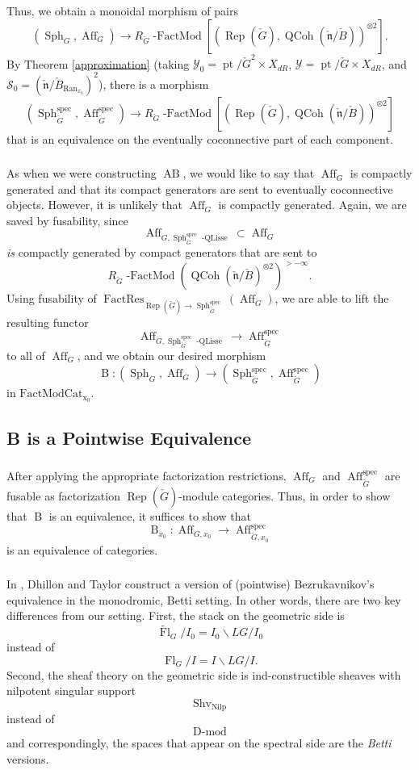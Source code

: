 \documentclass[10pt,a4paper]{amsart}
\newcommand{\on}[1]{\operatorname{#1}}
\newcommand{\Dmod}{\on{D-mod}}
\newcommand{\Gcheck}{\check{G}}
\newcommand{\ncheck}{\check{\mathfrak{n}}}
\newcommand{\Bcheck}{\check{B}}
\newcommand{\Ran}{\on{Ran}}
\newcommand{\FactModCat}{\on{FactModCat_{x_0}}}
\newcommand{\sssec}[1]{\subsubsection{}}
\begin{document}
\sssec{}
Thus, we obtain a monoidal morphism of pairs 
$$
(\on{Sph}_G, \on{Aff}_G) \to R_{\Gcheck}\on{-FactMod}[(\on{Rep}(\Gcheck), \operatorname{QCoh}(\ncheck/\Bcheck))^{\otimes 2}].
$$
By Theorem \ref{approximation} (taking $\mathcal{Y}_0 = \on{pt}/\Gcheck^2 \times X_{dR}$, $\mathcal{Y} = \on{pt}/\Gcheck \times X_{dR}$, and $\mathcal{S}_0 = (\ncheck/\Bcheck_{\Ran_{x_0}})^2$), there is a morphism
$$
(\on{Sph}_{\Gcheck}^{\on{spec}}, \on{Aff}_{\Gcheck}^{\on{spec}}) \to R_{\Gcheck}\on{-FactMod}[(\on{Rep}(\Gcheck), \operatorname{QCoh}(\ncheck/\Bcheck))^{\otimes 2}]
$$
that is an equivalence on the eventually coconnective part of each component.

\sssec{}
As when we were constructing $\on{AB}$, we would like to say that $\on{Aff}_{G}$ is compactly generated and that its compact generators are sent to eventually coconnective objects. However, it is unlikely that $\on{Aff}_{G}$ is compactly generated. Again, we are saved by fusability, since 
$$
\on{Aff}_{G, {\on{Sph}_{\Gcheck}^{\on{spec}}\on{-QLisse}}} \subset \on{Aff}_G
$$
\emph{is} compactly generated by compact generators that are sent to
$$
R_{\Gcheck}\on{-FactMod}(\operatorname{QCoh}(\ncheck/\Bcheck)^{\otimes 2})^{> -\infty}.
$$
Using fusability of $\on{FactRes}_{\on{Rep}(\Gcheck) \to \on{Sph}_{\Gcheck}^{\on{spec}}}(\on{Aff}_{G})$, we are able to lift the resulting functor
$$
\on{Aff}_{G, {\on{Sph}_{\Gcheck}^{\on{spec}}\on{-QLisse}}} \longrightarrow \on{Aff}_{\Gcheck}^{\on{spec}}
$$
to all of $\on{Aff}_{G}$, and we obtain our desired morphism
$$
\on{B} : (\on{Sph}_G, \on{Aff}_{G}) \longrightarrow (\on{Sph}_{\Gcheck}^{\on{spec}}, \on{Aff}_{\Gcheck}^{\on{spec}})
$$
in $\FactModCat$.

\subsection{B is a Pointwise Equivalence} \label{B is a Pointwise Equivalence}

\sssec{}
After applying the appropriate factorization restrictions, $\on{Aff}_G$ and $\on{Aff}_{\Gcheck}^{\on{spec}}$ are fusable as factorization $\on{Rep}(\Gcheck)$-module categories. Thus, in order to show that $\on{B}$ is an equivalence, it suffices to show that 
$$
\on{B}_{x_0} : \on{Aff}_{G, x_0} \longrightarrow \on{Aff}_{\Gcheck, x_0}^{\on{spec}}
$$ is an equivalence of categories.

\sssec{}
In \cite{DT}, Dhillon and Taylor construct a version of (pointwise) Bezrukavnikov's equivalence in the monodromic, Betti setting. In other words, there are two key differences from our setting. First, the stack on the geometric side is
$$
\tilde{\on{Fl}}_G/I_0 = I_0 \backslash LG / I_0
$$
instead of
$$
\on{Fl}_G/I = I \backslash LG/I.
$$
Second, the sheaf theory on the geometric side is ind-constructible sheaves with nilpotent singular support
$$
\on{Shv}_{\on{Nilp}}
$$
instead of
$$
\Dmod
$$
and correspondingly, the spaces that appear on the spectral side are the \emph{Betti} versions.
\end{document}
